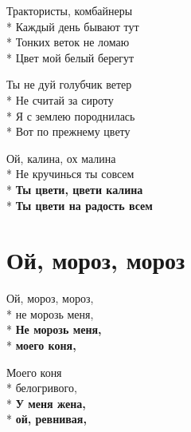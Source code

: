 \medskip

\begin{minipage}{\linewidth}
Трактористы, комбайнеры\\*
Каждый день бывают тут\\*
Тонких веток не ломаю\\*
Цвет мой белый берегут\\
\end{minipage}\par\medskip\nobreak

\medskip

\begin{minipage}{\linewidth}
Ты не дуй голубчик ветер\\*
Не считай за сироту\\*
Я с землею породнилась\\*
Вот по прежнему цвету\\
\end{minipage}\par\medskip\nobreak

\medskip

\begin{minipage}{\linewidth}
Ой, калина, ох малина\\*
Не кручинься ты совсем\\*
\textbf{Ты цвети, цвети калина}\\*
\textbf{Ты цвети на радость всем}\\
\end{minipage}

\vspace{\fill}\newpage

\section{Ой, мороз, мороз}
\label{song:Ой,_мороз,_мороз}

\medskip

\begin{minipage}{\linewidth}
Ой, мороз, мороз,\\*
не морозь меня,\\*
\textbf{Не морозь меня,}\\*
\textbf{моего коня,}\\
\end{minipage}\par\medskip\nobreak

\medskip

\begin{minipage}{\linewidth}
Моего коня\\*
белогривого,\\*
\textbf{У меня жена,}\\*
\textbf{ой, ревнивая,}\\
\end{minipage}\par\medskip\nobreak

